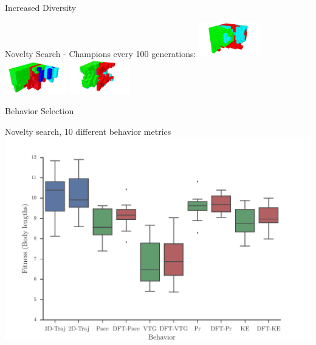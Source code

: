 \documentclass[6pt]{beamer}
\begin{document}
{\begin{frame}{Increased Diversity}
\begin{block}{Novelty Search - Champions every 100 generations:}
\includegraphics[width=0.2\textwidth]{../Figures/Robots/n_4_g_800.jpg}
\includegraphics[width=0.2\textwidth]{../Figures/Robots/n_4_g_900.jpg}
\includegraphics[width=0.2\textwidth]{../Figures/Robots/n_4_g_1000.jpg}
\end{block}
\end{frame}

\begin{frame}{Behavior Selection}
\begin{block}{Novelty search, 10 different behavior metrics}
\centering
\includegraphics[width=1.0\textwidth]{../Figures/Results/BehaviorPerformanceNoveltyOnly.pdf}
\end{block}
\end{frame}

}
\end{document}
